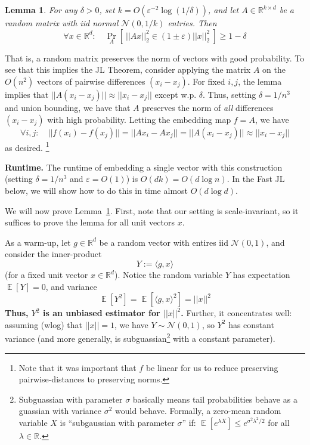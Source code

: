\documentclass[]{article}
\newtheorem{lemma}{Lemma}
\newcommand{\1}{\mathbb{1}}
\newcommand{\x}{\times}
\newcommand{\R}{\mathbb{R}}
\newcommand{\N}{\mathcal{N}}
\newcommand{\E}{\mathop{\mathbb{E}}}
\renewcommand{\epsilon}{\varepsilon}
\newcommand{\innp}[1]{\langle #1 \rangle}
\begin{document}
\begin{lemma}
    \label{lem:jl}
    For any $\delta > 0$, set $k = O(\epsilon^{-2}\log(1/\delta))$,
    and let $A \in \R^{k \x d}$ be a random matrix with iid normal $\N(0, 1/k)$ entries.
    Then
    $$\forall x \in \R^d: \quad
    \Pr_{A}\left[~ ||Ax||_2^2 \in  (1 \pm \epsilon)||x||_2^2 ~\right] \geq 1- \delta$$
\end{lemma}
That is, a random matrix preserves the norm of vectors with good probability.
To see that this implies the JL Theorem, consider applying the matrix $A$ on
the $O(n^2)$ vectors of pairwise differences $(x_i - x_j)$.
For fixed $i,j$, the lemma implies that
$||A(x_i - x_j)|| \approx ||x_i - x_j||$ except w.p. $\delta$.
Thus, setting $\delta = 1/n^3$ and union bounding, we have that $A$ preserves the norm of
\emph{all} differences $(x_i - x_j)$ with high probability.
Letting the embedding map $f = A$, we have
$$\forall i,j: \quad ||f(x_i) - f(x_j)|| = ||Ax_i - Ax_j|| =
||A(x_i - x_j)|| \approx
||x_i - x_j||$$
as desired.
\footnote{Note that it was important that $f$ be linear for us to reduce
preserving pairwise-distances to preserving norms.}

{\bf Runtime.} The runtime of embedding a single vector with this construction (setting
$\delta=1/n^3$ and $\epsilon=O(1)$) is
$O(dk) = O(d \log n)$. In the Fast JL below, we will show how to do this in
time almost $O(d \log d)$.


We will now prove Lemma~\ref{lem:jl}.
First, note that our setting is scale-invariant, so it suffices to prove the
lemma for all unit vectors $x$.

As a warm-up, let $g \in \R^d$ be a random vector with entires iid
$\N(0, 1)$, and consider the inner-product
$$Y := \innp{g, x}$$
(for a fixed unit vector $x \in \R^d$).
Notice the random variable $Y$
has expectation $\E[Y] = 0$,
and variance $$\E[Y^2] = \E[\innp{g,x}^2] = ||x||^2$$
{\bf Thus, $Y^2$ is an unbiased estimator for $||x||^2$.}
Further, it concentrates well: assuming (wlog) that $||x||=1$,
we have $Y \sim \N(0, 1)$, so $Y^2$ has constant variance (and more generally,
is subguassian\footnote{
    Subguassian with parameter $\sigma$ basically means
    tail probabilities behave as a guassian with variance $\sigma^2$ would behave.
    Formally, a zero-mean random variable $X$ is ``subgaussian with parameter
    $\sigma$'' if: $\E[e^{\lambda X}] \leq e^{\sigma^2\lambda^2/2}$ for all
    $\lambda \in \R$.
}
with a constant parameter).
\end{document}
